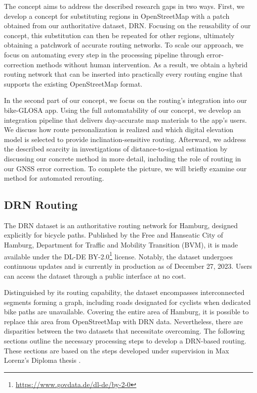 The concept aims to address the described research gaps in two ways. First, we develop a concept for substituting regions in OpenStreetMap with a patch obtained from our authoritative dataset, DRN. Focusing on the reusability of our concept, this substitution can then be repeated for other regions, ultimately obtaining a patchwork of accurate routing networks. To scale our approach, we focus on automating every step in the processing pipeline through error-correction methods without human intervention. As a result, we obtain a hybrid routing network that can be inserted into practically every routing engine that supports the existing OpenStreetMap format.

In the second part of our concept, we focus on the routing's integration into our bike-GLOSA app. Using the full automatability of our concept, we develop an integration pipeline that delivers day-accurate map materials to the app's users. We discuss how route personalization is realized and which digital elevation model is selected to provide inclination-sensitive routing. Afterward, we address the described scarcity in investigations of distance-to-signal estimation by discussing our concrete method in more detail, including the role of routing in our GNSS error correction. To complete the picture, we will briefly examine our method for automated rerouting.

\subsection{DRN Routing}

The DRN dataset is an authoritative routing network for Hamburg, designed explicitly for bicycle paths. Published by the Free and Hanseatic City of Hamburg, Department for Traffic and Mobility Transition (BVM), it is made available under the DL-DE BY-2.0\footnote{\url{https://www.govdata.de/dl-de/by-2-0}} license. Notably, the dataset undergoes continuous updates and is currently in production as of December 27, 2023. Users can access the dataset through a public interface at no cost. 

Distinguished by its routing capability, the dataset encompasses interconnected segments forming a graph, including roads designated for cyclists when dedicated bike paths are unavailable. Covering the entire area of Hamburg, it is possible to replace this area from OpenStreetMap with DRN data. Nevertheless, there are disparities between the two datasets that necessitate overcoming. The following sections outline the necessary processing steps to develop a DRN-based routing. These sections are based on the steps developed under supervision in Max Lorenz's Diploma thesis \cite{lorenz_2022}.

